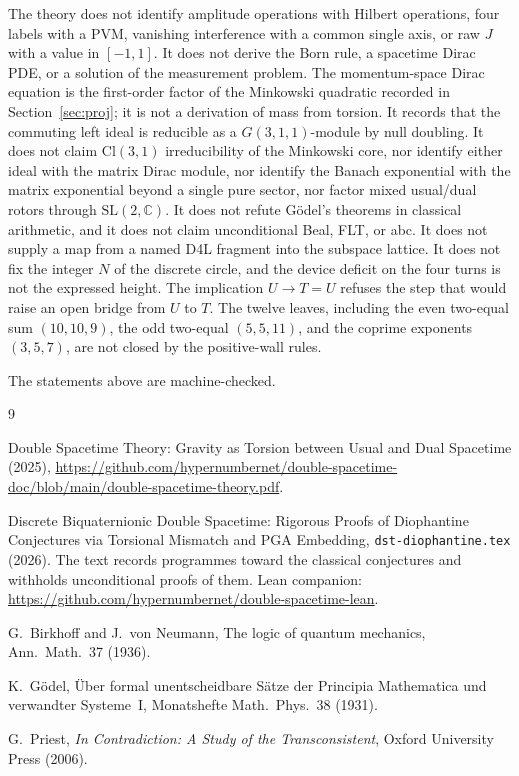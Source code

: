 \documentclass[a4paper]{article}
\theoremstyle{definition}
\begin{document}
The theory does not identify amplitude operations with Hilbert
operations, four labels with a PVM, vanishing interference with a
common single axis, or raw \(J\) with a value in \([-1,1]\). It does
not derive the Born rule, a spacetime Dirac PDE, or a solution of the
measurement problem. The momentum-space Dirac equation is the
first-order factor of the Minkowski quadratic recorded in
Section~\ref{sec:proj}; it is not a derivation of mass from torsion. It records that the commuting left ideal is reducible as a \(G(3,1,1)\)-module by null doubling. It does not claim \(\mathrm{Cl}(3,1)\) irreducibility of the Minkowski core, nor identify either ideal with the matrix Dirac module, nor identify the Banach exponential with the matrix
exponential beyond a single pure sector, nor factor mixed usual/dual
rotors through \(\mathrm{SL}(2,\mathbb{C})\). It does not refute G\"odel's
theorems in classical arithmetic, and it does not claim unconditional
Beal, FLT, or abc. It does not supply a map from a named D4L fragment
into the subspace lattice. It does not fix the integer \(N\) of the
discrete circle, and the device deficit on the four turns is not the
expressed height. The implication \(U\to T=U\) refuses the
step that would raise an open bridge from \(U\) to \(T\). The twelve
leaves, including the even two-equal sum \((10,10,9)\), the odd
two-equal \((5,5,11)\), and the coprime exponents \((3,5,7)\), are not
closed by the positive-wall rules.

The statements above are machine-checked.

\begin{thebibliography}{9}
\raggedright

Double Spacetime Theory: Gravity as Torsion between Usual and Dual Spacetime (2025),
\url{https://github.com/hypernumbernet/double-spacetime-doc/blob/main/double-spacetime-theory.pdf}.

Discrete Biquaternionic Double Spacetime: Rigorous Proofs of Diophantine
Conjectures via Torsional Mismatch and PGA Embedding,
\texttt{dst-diophantine.tex} (2026).
The text records programmes toward the classical conjectures and
withholds unconditional proofs of them. Lean companion:
\url{https://github.com/hypernumbernet/double-spacetime-lean}.

G.~Birkhoff and J.~von Neumann, The logic of quantum mechanics,
Ann.\ Math.\ 37 (1936).

K.~G\"odel, \"Uber formal unentscheidbare S\"atze der Principia Mathematica
und verwandter Systeme~I, Monatshefte Math.\ Phys.\ 38 (1931).

G.~Priest, \emph{In Contradiction: A Study of the Transconsistent},
Oxford University Press (2006).

\end{thebibliography}
\end{document}
